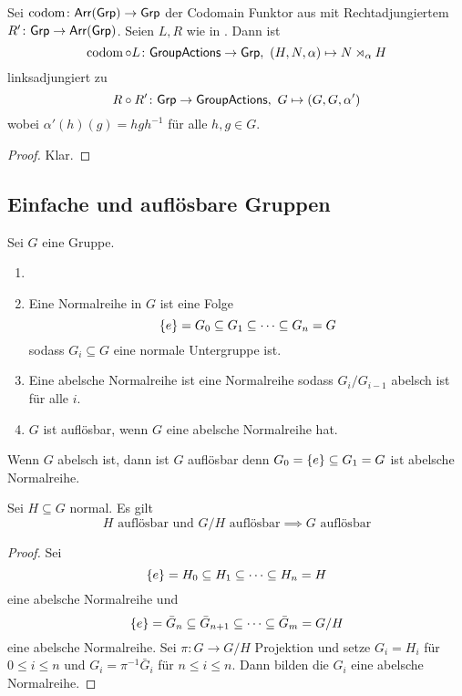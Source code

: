 \begin{Lemma}
    Sei \(\operatorname{codom}\colon \mathsf{Arr}(\mathsf{Grp})\to\mathsf{Grp}\) der Codomain Funktor aus  mit Rechtadjungiertem \(R'\colon\mathsf{Grp}\to\mathsf{Arr}(\mathsf{Grp})\).
    Seien \(L,R\) wie in . Dann ist \[\operatorname{codom}\circ L\colon \mathsf{GroupActions}\to \mathsf{Grp},\ (H,N,\alpha)\mapsto N\rtimes_\alpha H\] linksadjungiert zu 
    \[R\circ R'\colon \mathsf{Grp}\to\mathsf{GroupActions},\ G\mapsto (G,G,\alpha')\] wobei \(\alpha'(h)(g)=hgh^{-1}\) für alle \(h,g\in G\).
\end{Lemma}
\begin{proof}
    Klar.
\end{proof}
    
\subsection{Einfache und auflösbare Gruppen}
Sei \(G\) eine Gruppe.
\begin{Def}
    \begin{enumerate}
        \item []
        \item Eine Normalreihe in \(G\) ist eine Folge \[\{e\}=G_0\subseteq G_1\subseteq \dots\subseteq G_n=G\] sodass \(G_i\subseteq G\) eine normale Untergruppe ist.
        \item Eine abelsche Normalreihe ist eine Normalreihe sodass \(G_i/G_{i-1}\) abelsch ist für alle \(i\).
        \item \(G\) ist auflösbar, wenn \(G\) eine abelsche Normalreihe hat.
    \end{enumerate}
\end{Def}
\begin{Bsp}
    Wenn \(G\) abelsch ist, dann ist \(G\) auflösbar denn \(G_0=\{e\}\subseteq G_1=G\) ist abelsche Normalreihe.
\end{Bsp}
\begin{Lemma}\label{Lem:AuflUntQuot}
    Sei \(H\subseteq G\) normal. Es gilt 
    \[H \text{ auflösbar und } G/H \text{ auflösbar}\implies G \text{ auflösbar}\]
\end{Lemma}
\begin{proof}
    Sei \[\{e\}=H_0\subseteq H_1\subseteq \dots\subseteq H_n=H\] eine abelsche Normalreihe und \[\{e\}=\bar G_n\subseteq\bar G_{n+1}\subseteq\dots \subseteq \bar G_m=G/H\] eine abelsche Normalreihe. Sei \(\pi\colon G\to G/H\) Projektion und setze \(G_i=H_i\) für \(0\leq i\leq n\) und \(G_i=\pi^{-1}\bar G_i\)  für \(n\leq i\leq n\).
    Dann bilden die \(G_i\) eine abelsche Normalreihe.
\end{proof}
